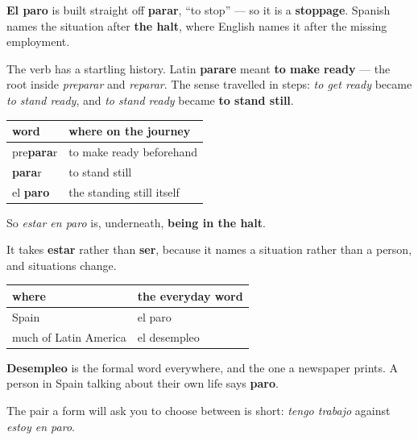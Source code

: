 \begin{cousinweb}
\textbf{El paro} is built straight off \textbf{parar}, \textquotedblleft{}to stop\textquotedblright{} — so it is a \textbf{stoppage}. Spanish names the situation after \textbf{the halt}, where English names it after the missing employment.

The verb has a startling history. Latin \textbf{parare} meant \textbf{to make ready} — the root inside \emph{preparar} and \emph{reparar}. The sense travelled in steps: \emph{to get ready} became \emph{to stand ready}, and \emph{to stand ready} became \textbf{to stand still}.

\noindent
\begin{tabularx}{\linewidth}{@{}>{\raggedright\arraybackslash}X>{\raggedright\arraybackslash}X@{}}
\toprule
\textbf{word} & \textbf{where on the journey} \\
\midrule
pre\textbf{para}r & to make ready beforehand \\
\textbf{para}r & to stand still \\
el \textbf{paro} & the standing still itself \\
\bottomrule
\end{tabularx}

So \emph{estar en paro} is, underneath, \textbf{being in the halt}.
\end{cousinweb}

\begin{grammarlens}[title={Grammar Lens: which verb, and which country}]
It takes \textbf{estar} rather than \textbf{ser}, because it names a situation rather than a person, and situations change.

\noindent
\begin{tabularx}{\linewidth}{@{}>{\raggedright\arraybackslash}X>{\raggedright\arraybackslash}X@{}}
\toprule
\textbf{where} & \textbf{the everyday word} \\
\midrule
Spain & el paro \\
much of Latin America & el desempleo \\
\bottomrule
\end{tabularx}

\textbf{Desempleo} is the formal word everywhere, and the one a newspaper prints. A person in Spain talking about their own life says \textbf{paro}.

The pair a form will ask you to choose between is short: \emph{tengo trabajo} against \emph{estoy en paro}.
\end{grammarlens}

